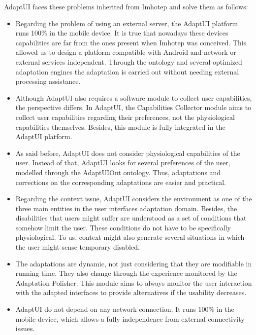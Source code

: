 AdaptUI faces these problems inherited from Imhotep and solve them as follows:

\begin{itemize}
  \item Regarding the problem of using an external server, the AdaptUI platform
  runs 100\% in the mobile device. It is true that nowadays these devices
  capabilities are far from the ones present when Imhotep was conceived. This
  allowed us to design a platform compatible with Android and network or 
  external services independent. Through the ontology and several optimized 
  adaptation engines the adaptation is carried out without needing external 
  processing assistance.
  
  \item Although AdaptUI also requires a software module to collect user
  capabilities, the perspective differs. In AdaptUI, the Capabilities Collector
  module aims to collect user capabilities regarding their preferences, not
  the physiological capabilities themselves. Besides, this module is fully
  integrated in the AdaptUI platform.
  
  \item As said before, AdaptUI does not consider physiological capabilities of
  the user. Instead of that, AdaptUI looks for several preferences of the user,
  modelled through the AdaptUIOnt ontology. Thus, adaptations and corrections
  on the corresponding adaptations are easier and practical.
  
  \item Regarding the context issue, AdaptUI considers the environment as one 
  of the three main entities in the user interfaces adaptation domain. Besides,
  the disabilities that users might suffer are understood as a set of conditions
  that somehow limit the user. These conditions do not have to be specifically
  physiological. To us, context might also generate several situations in which
  the user might sense temporary disabled.
  
  \item The adaptations are dynamic, not just considering that they are 
  modifiable in running time. They also change through the experience monitored 
  by the Adaptation Polisher. This module aims to always monitor the user 
  interaction with the adapted interfaces to provide alternatives if the 
  usability decreases.
  
  \item AdaptUI do not depend on any network connection. It runs 100\% in the
  mobile device, which allows a fully independence from external connectivity
  issues.
\end{itemize}

